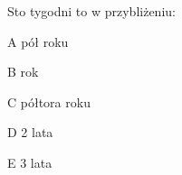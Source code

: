 \begin{tresc}
Sto tygodni to w przybliżeniu:
\end{tresc}
\begin{wariant}{A} pół roku \end{wariant}
\begin{wariant}{B} rok \end{wariant}
\begin{wariant}{C} półtora roku \end{wariant}
\begin{wariant}{D} 2 lata \end{wariant}
\begin{wariant}{E} 3 lata \end{wariant}

